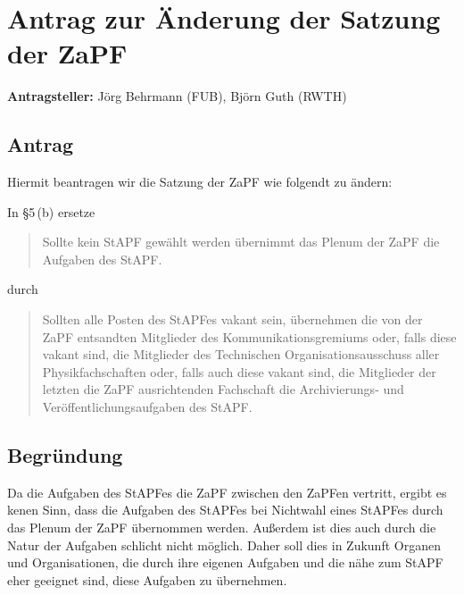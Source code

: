 \documentclass[draft,10pt,oneside]{scrartcl}
\begin{document}
\newpage

\section*{Antrag zur Änderung der Satzung der ZaPF}

\textbf{Antragsteller:} Jörg Behrmann (FUB), Björn Guth (RWTH)

\subsection*{Antrag}

Hiermit beantragen wir die Satzung der ZaPF wie folgendt zu ändern:

In §5\,(b) ersetze
\begin{quote}
	Sollte kein StAPF gewählt werden übernimmt das Plenum der ZaPF die Aufgaben
	des StAPF.
\end{quote}
durch
\begin{quote}
	Sollten alle Posten des StAPFes vakant sein, übernehmen die von der ZaPF
	entsandten Mitglieder des Kommunikationsgremiums oder, falls diese vakant sind,
	die Mitglieder des Technischen Organisationsausschuss aller Physikfachschaften
	oder, falls auch diese vakant sind, die Mitglieder der letzten die ZaPF
	ausrichtenden Fachschaft die Archivierungs- und Veröffentlichungsaufgaben des
	StAPF.
\end{quote}

\subsection*{Begründung}
Da die Aufgaben des StAPFes die ZaPF zwischen den ZaPFen vertritt, ergibt es
kenen Sinn, dass die Aufgaben des StAPFes bei Nichtwahl eines StAPFes durch das
Plenum der ZaPF übernommen werden. Außerdem ist dies auch durch die Natur der
Aufgaben schlicht nicht möglich. Daher soll dies in Zukunft Organen und
Organisationen, die durch ihre eigenen Aufgaben und die nähe zum StAPF eher
geeignet sind, diese Aufgaben zu übernehmen.
\end{document}
